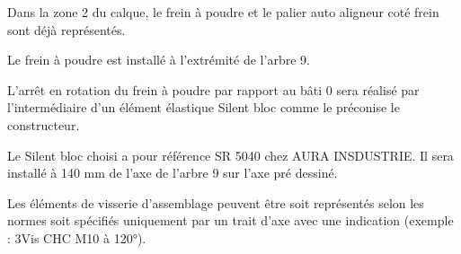 Dans la zone 2 du calque, le frein à poudre et le palier auto aligneur coté frein sont déjà
représentés.

Le frein à poudre est installé à l'extrémité de l'arbre 9.

L'arrêt en rotation du frein à poudre par rapport au bâti 0 sera réalisé par l'intermédiaire d'un
élément élastique \og Silent bloc \fg comme le préconise le constructeur.

Le \og Silent bloc \fg choisi a pour référence SR 5040 chez AURA INSDUSTRIE. Il sera installé à
140 mm de l'axe de l'arbre 9 sur l'axe pré dessiné.

Les éléments de visserie d'assemblage peuvent être soit représentés selon les normes soit
spécifiés uniquement par un trait d'axe avec une indication (exemple : 3Vis CHC M10 à 120°).



